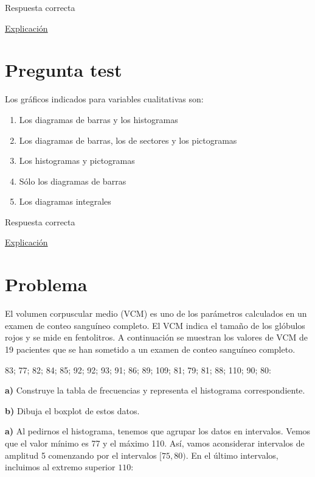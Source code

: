 \documentclass[
]{book}
\providecommand{\tightlist}{%
  \setlength{\itemsep}{0pt}\setlength{\parskip}{0pt}}
\begin{document}
Respuesta correcta

\href{https://1fjmanzano.github.io/bioestadistica/histogramas.html}{Explicación}

\hypertarget{pregunta-test-59}{%
\section{Pregunta test}\label{pregunta-test-59}}

Los gráficos indicados para variables cualitativas son:

\begin{enumerate}
\def\labelenumi{\alph{enumi})}
\tightlist
\item
  Los diagramas de barras y los histogramas
\item
  Los diagramas de barras, los de sectores y los pictogramas
\item
  Los histogramas y pictogramas
\item
  Sólo los diagramas de barras
\item
  Los diagramas integrales
\end{enumerate}

Respuesta correcta

\href{https://1fjmanzano.github.io/bioestadistica/diagramas-de-barras-y-sectores.html}{Explicación}

\hypertarget{problema-10}{%
\section{Problema}\label{problema-10}}

El volumen corpuscular medio (VCM) es uno de los parámetros calculados en un examen de conteo sanguíneo completo. El VCM indica el tamaño de los glóbulos rojos y se mide en fentolitros. A continuación se muestran los valores de VCM de 19 pacientes que se han sometido a un examen de conteo sanguíneo completo.

83; 77; 82; 84; 85; 92; 92; 93; 91; 86; 89; 109; 81; 79; 81; 88; 110; 90; 80:

\textbf{a)} Construye la tabla de frecuencias y representa el histograma correspondiente.

\textbf{b)} Dibuja el boxplot de estos datos.

\textbf{a)} Al pedirnos el histograma, tenemos que agrupar los datos en intervalos. Vemos que el valor mínimo es 77 y el máximo 110. Así, vamos aconsiderar intervalos de amplitud 5 comenzando por el intervalos \([75,80)\). En el último intervalos, incluimos al extremo superior \(110\):
\end{document}
